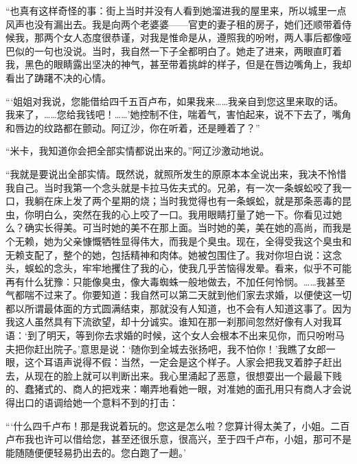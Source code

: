 \par “也真有这样奇怪的事：街上当时并没有人看到她溜进我的屋里来，所以城里一点风声也没有漏出去。我是向两个老婆婆——官吏的妻子租的房子，她们还顺带着侍候我，那两个女人态度很恭谨，对我是惟命是从，遵照我的吩咐，两人事后都像哑巴似的一句也没说。当时，我自然一下子全都明白了。她走了进来，两眼直盯着我，黑色的眼睛露出坚决的神气，甚至带着挑衅的样子，但是在唇边嘴角上，我却看出了踌躇不决的心情。
\par “‘姐姐对我说，您能借给四千五百卢布，如果我来……我亲自到您这里来取的话。我来了，……您给我钱吧！……’她控制不住，喘着气，害怕起来，说不下去了，嘴角和唇边的纹路都在颤动。阿辽沙，你在听着，还是睡着了？”
\par “米卡，我知道你会把全部实情都说出来的。”阿辽沙激动地说。
\par “我就是要说出全部实情。既然说，就照所发生的原原本本全说出来，我决不怜惜我自己。当时我第一个念头就是卡拉马佐夫式的。兄弟，有一次一条蜈蚣咬了我一口，我躺在床上发了两个星期的烧；当时我觉得也有一条蜈蚣，就是那条恶毒的昆虫，你明白么，突然在我的心上咬了一口。我用眼睛打量了她一下。你看见过她么？确实长得美。可当时她的美不在那上面。当时她的美，美在她的高尚，而我是个无赖，她为父亲慷慨牺牲显得伟大，而我是个臭虫。现在，全得受我这个臭虫和无赖支配了，整个的她，包括精神和肉体。她被包围住了。我对你坦白说：这念头，蜈蚣的念头，牢牢地攫住了我的心，使我几乎苦恼得发晕。看来，似乎不可能再有什么犹豫：只能像臭虫，像大毒蜘蛛一般地做去，不加任何怜悯。……我甚至气都喘不过来了。你要知道：我自然可以第二天就到他们家去求婚，以便使这一切都以所谓最体面的方式圆满结束，那就没有人知道，也不会有人知道这事了。因为我这人虽然具有下流欲望，却十分诚实。谁知在那一刹那间忽然好像有人对我耳语：‘到了明天，等到你去求婚的时候，这个女人会根本不出来见你，而只吩咐马夫把你赶出院子。’意思是说：‘随你到全城去张扬吧，我不怕你！’我瞧了女郎一眼，这个耳语声说得不假：当然，一定会是这个样子。人家会把我叉着脖子赶出去，从现在的脸上就可以判断出来。我心里涌起了恶意，很想耍出一个最最下贱的、蠢猪式的、商人的把戏来：嘲弄地看她一眼，对准她的面孔用只有商人才会说得出口的语调给她一个意料不到的打击：
\par “‘什么四千卢布！那是我说着玩的。您这是怎么啦？您算计得太美了，小姐。二百卢布我也许可以借给您，甚至还很乐意，很高兴，至于四千卢布，小姐，那可不是能随随便便轻易扔出去的。您白跑了一趟。’
